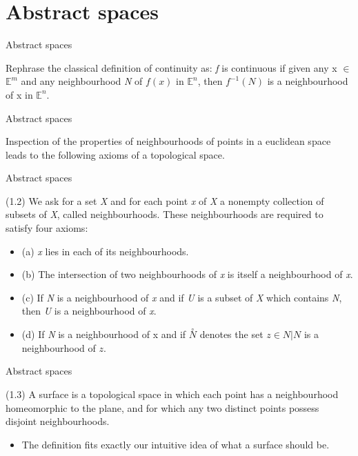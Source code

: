 \documentclass{beamer}
\begin{document}
\section{Abstract spaces}

\begin{frame}{Abstract spaces}
  \begin{block}{}
    Rephrase the classical definition of continuity as: \textsl{f} is continuous if given any x $\in$ $\mathbb{E}^m$ and any neighbourhood \textsl{N} of $f(x)$ in $\mathbb{E}^n$, then $f^{-1}(N)$ is a neighbourhood of x in $\mathbb{E}^n$.
  \end{block}
\end{frame}

\begin{frame}{Abstract spaces}
  \begin{block}{}
    Inspection of the properties of neighbourhoods of points in a euclidean space leads to the following axioms of a topological space.
  \end{block}
\end{frame}

\begin{frame}{Abstract spaces}
  \begin{block}{}
    (1.2) We ask for a set \textsl{X} and for each point \textsl{x} of \textsl{X} a nonempty collection of subsets of \textsl{X}, called neighbourhoods. These neighbourhoods are required to satisfy four axioms:
    \begin{itemize}
    \item (a) \textsl{x} lies in each of its neighbourhoods.
    \item (b) The intersection of two neighbourhoods of \textsl{x} is itself a neighbourhood of \textsl{x}.
    \item (c) If \textsl{N} is a neighbourhood of \textsl{x} and if \textsl{U} is a subset of \textsl{X} which contains \textsl{N}, then \textsl{U} is a neighbourhood of \textsl{x}.
    \item (d) If \textsl{N} is a neighbourhood of x and if $\overset{\circ}{N}$ denotes the set {{$z \in N|N$ is a neighbourhood of $z$}}.
    \end{itemize}
  \end{block}
\end{frame}

\begin{frame}{Abstract spaces}
  \begin{definition}[Surface]
    (1.3) A surface is a topological space in which each point has a neighbourhood homeomorphic to the plane, and for which any two distinct points possess disjoint neighbourhoods.
    \begin{itemize}
    \item The definition fits exactly our intuitive idea of what a surface should be.
    \end{itemize}
  \end{definition}
\end{frame}
\end{document}
